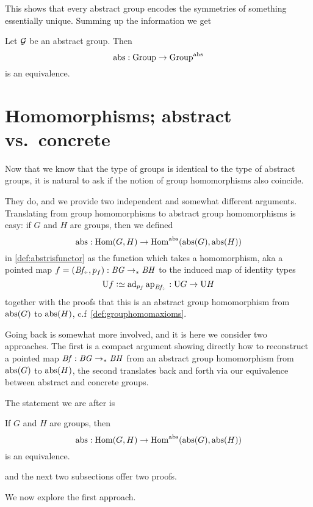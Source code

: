 This shows that every abstract group encodes the symmetries of something essentially unique.  Summing up the information we get
\begin{theorem}
  \label{lem:Groupsareidentitytypes}Let ${\mathcal G}$ be an abstract group.
Then
$$\mathrm{abs}:\mathrm{Group}\to\mathrm{Group}^{\mathrm{abs}}$$ is an equivalence.
\end{theorem}

\section{Homomorphisms; abstract vs.~concrete}
\label{sec:homabsisconcr}

Now that we know that the type of groups is identical to the type of abstract groups, it is natural to ask if the notion of group homomorphisms also coincide.

They do, and we provide two independent and somewhat different arguments.  Translating from group homomorphisms to abstract group homomorphisms is easy: if $G$ and $H$ are groups, then we defined
$$\abstr:\Hom(G,H)\to\Hom^\abstr(\abstr(G),\abstr(H))$$
in \cref{def:abstrisfunctor} as the function which takes a homomorphism, aka a pointed map $f=(\Bf_\div,p_f):\BG\ptdto\BH$ to the induced map of identity types
$$\US f\defequi \mathrm{ad}_{p_f}\ap{\Bf_\div}:\USym G\to\USym H$$
 together with the proofs that this is an abstract group homomorphism from $\mathrm{abs}(G)$ to $\mathrm{abs}(H)$, c.f~\cref{def:grouphomomaxioms}.


Going back is somewhat more involved, and it is here we consider two approaches.
The first is a compact argument showing directly how to reconstruct a pointed map $\mathit{B}\mathit{f}:\mathit{B}\mathit{G}\to_\ast\mathit{B}\mathit{H}$ from an abstract group homomorphism from $\mathrm{abs}(G)$ to $\mathrm{abs}(H)$, the second translates back and forth via our equivalence between abstract and concrete groups.



The statement we are after is


\begin{lemma}
  \label{lem:homomabstrconcr}
  If $G$ and $H$ are groups, then
$$\abstr:\Hom(G,H)\to\Hom^\abstr(\abstr(G),\abstr(H))$$
is an equivalence.
\end{lemma}
and the next two subsections offer two proofs.



\label{sec:thierrysdelooping}
We now explore the first approach.

